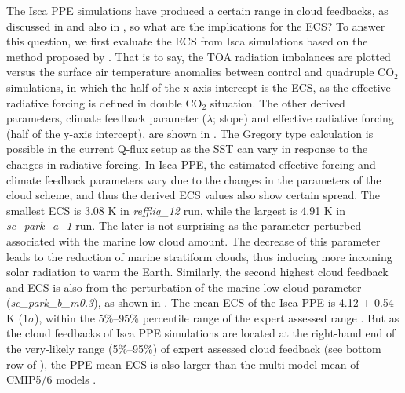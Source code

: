 The Isca PPE simulations have produced a certain range in cloud feedbacks, as discussed in  and also in , so what are the implications for the ECS? To answer this question, we first evaluate the ECS from Isca simulations based on the method proposed by \cite{Gregory2004}. That is to say, the TOA radiation imbalances are plotted versus the surface air temperature anomalies between control and quadruple CO$_2$ simulations, in which the half of the x-axis intercept is the ECS, as the effective radiative forcing is defined in double CO$_2$ situation. The other derived parameters, climate feedback parameter ($\lambda$; slope) and effective radiative forcing (half of the y-axis intercept), are shown in . The Gregory type calculation is possible in the current Q-flux setup as the SST can vary in response to the changes in radiative forcing. In Isca PPE, the estimated effective forcing and climate feedback parameters vary due to the changes in the parameters of the cloud scheme, and thus the derived ECS values also show certain spread. The smallest ECS is 3.08 K in \textit{reffliq\_12} run, while the largest is 4.91 K in \textit{sc\_park\_a\_1} run. The later is not surprising as the parameter perturbed associated with the marine low cloud amount. The decrease of this parameter leads to the reduction of marine stratiform clouds, thus inducing more incoming solar radiation to warm the Earth. Similarly, the second highest cloud feedback and ECS is also from the perturbation of the marine low cloud parameter (\textit{sc\_park\_b\_m0.3}), as shown in . The mean ECS of the Isca PPE is 4.12 $\pm$ 0.54 K (1$\sigma$), within the 5\%--95\% percentile range of the expert assessed range \citep{Sherwood2020}. But as the cloud feedbacks of Isca PPE simulations are located at the right-hand end of the very-likely range (5\%--95\%) of expert assessed cloud feedback (see bottom row of ), the PPE mean ECS is also larger than the multi-model mean of CMIP5/6 models \citep[see Fig. 1 of ][]{Zelinka2020causes}.

